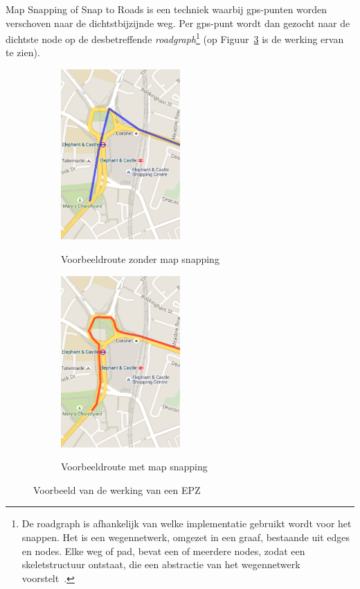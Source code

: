 Map Snapping of Snap to Roads is een techniek waarbij gps-punten worden
verschoven naar de dichtstbijzijnde weg. Per gps-punt wordt dan gezocht naar de
dichtste node op de desbetreffende \textit{roadgraph}\footnote{De roadgraph is
    afhankelijk van welke implementatie gebruikt wordt voor het snappen. Het is een
    wegennetwerk, omgezet in een graaf, bestaande uit edges en nodes. Elke weg of
    pad, bevat een of meerdere nodes, zodat een skeletstructuur ontstaat, die een
    abstractie van het wegennetwerk voorstelt~\cite{seiler2022haul}.} (op
Figuur~\ref{fig:MapSnapping} is de werking ervan te
zien)\cite{Snapping96:online}.
\begin{figure}[h]
    \centering
    \begin{subfigure}[b]{.5\textwidth}
        \centering
        \caption{Voorbeeldroute zonder map snapping}
        \includegraphics[width=0.5\textwidth]{fig/Map Snapping/before.png}\label{fig:before_MapSnapping}
    \end{subfigure}\hfill
    \begin{subfigure}[b]{.5\textwidth}
        \centering
        \caption{Voorbeeldroute met map snapping}
        \includegraphics[width=0.5\textwidth]{fig/Map Snapping/after.png}\label{fig:after_MapSnapping}
    \end{subfigure}
    \caption{Voorbeeld van de werking van een EPZ}\label{fig:MapSnapping}
\end{figure}

